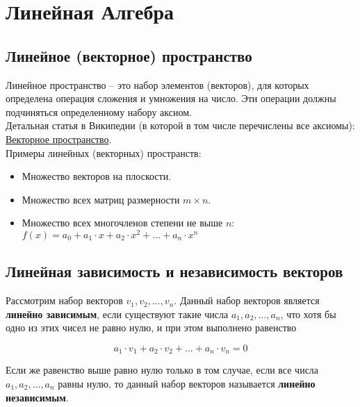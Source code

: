 \documentclass{article}
\begin{document}
\tableofcontents

\section{Линейная Алгебра}

\subsection{Линейное (векторное) пространство}

Линейное пространство -- это набор элементов (векторов), для которых определена операция сложения и умножения на число. Эти операции должны подчиняться определенному набору аксиом. \\

Детальная статья в Википедии (в которой в том числе перечислены все аксиомы): \href{https://ru.wikipedia.org/wiki/%D0%92%D0%B5%D0%BA%D1%82%D0%BE%D1%80%D0%BD%D0%BE%D0%B5_%D0%BF%D1%80%D0%BE%D1%81%D1%82%D1%80%D0%B0%D0%BD%D1%81%D1%82%D0%B2%D0%BE}{Векторное пространство}. \\

Примеры линейных (векторных) пространств:

\begin{itemize}
	\item Множество векторов на плоскости.
	\item Множество всех матриц размерности $m \times n$.
	\item Множество всех многочленов степени не выше $n$: \\ $f(x) = a_0 + a_1 \cdot x + a_2 \cdot x^2 + \dots + a_n \cdot x^n$
\end{itemize}

\subsection{Линейная зависимость и независимость векторов}

Рассмотрим набор векторов $v_1, v_2, \dots, v_n$. Данный набор векторов является \textbf{линейно зависимым}, если существуют такие числа $a_1, a_2, \dots, a_n$, что хотя бы одно из этих чисел не равно нулю, и при этом выполнено равенство

$$ a_1 \cdot v_1 + a_2 \cdot v_2 + \dots + a_n \cdot v_n = 0 $$

Если же равенство выше равно нулю только в том случае, если все числа $a_1, a_2, \dots, a_n$ равны нулю, то данный набор векторов называется \textbf{линейно независимым}.
\end{document}
